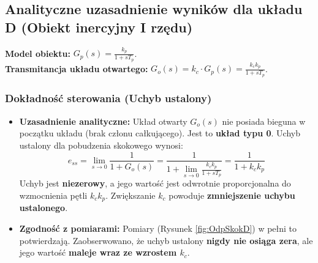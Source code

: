 \documentclass[12pt,a4paper]{article}
\begin{document}
	\subsection{Analityczne uzasadnienie wyników dla układu D (Obiekt inercyjny I rzędu)}
	
	\textbf{Model obiektu:} $G_p(s) = \frac{k_p}{1 + sT_p}$. \\
	\textbf{Transmitancja układu otwartego:} $G_o(s) = k_c \cdot G_p(s) = \frac{k_c k_p}{1 + sT_p}$.
	
	\subsubsection{Dokładność sterowania (Uchyb ustalony)}
	\begin{itemize}
		\item \textbf{Uzasadnienie analityczne:} Układ otwarty $G_o(s)$ nie posiada bieguna w początku układu (brak członu całkującego). Jest to \textbf{układ typu 0}. Uchyb ustalony dla pobudzenia skokowego wynosi:
		\[
		e_{ss} = \lim_{s \to 0} \frac{1}{1 + G_o(s)} = \frac{1}{1 + \lim_{s \to 0} \frac{k_c k_p}{1 + sT_p}} = \frac{1}{1 + k_c k_p}
		\]
		Uchyb jest \textbf{niezerowy}, a jego wartość jest odwrotnie proporcjonalna do wzmocnienia pętli $k_c k_p$. Zwiększanie $k_c$ powoduje \textbf{zmniejszenie uchybu ustalonego}.
		
		\item \textbf{Zgodność z pomiarami:} Pomiary (Rysunek \ref{fig:OdpSkokD}) w pełni to potwierdzają. Zaobserwowano, że uchyb ustalony \textbf{nigdy nie osiąga zera}, ale jego wartość \textbf{maleje wraz ze wzrostem $k_c$}.
	\end{itemize}
	
\end{document}
